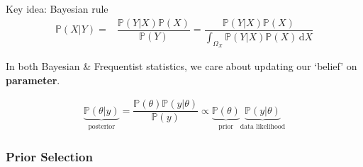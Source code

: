     



\subsection{}
Key idea: Bayesian rule
\begin{align*}
    \mathbb{P}\left( X|Y \right)=&\dfrac{\mathbb{P}\left( Y|X \right) \mathbb{P}\left( X  \right) }{\mathbb{P}\left( Y \right) }=\dfrac{\mathbb{P}\left( Y|X  \right) \mathbb{P}\left( X  \right) }{\int _{\Omega_X} \mathbb{P}\left( Y|X  \right) \mathbb{P}\left( X  \right)  \,\mathrm{d}X} 
\end{align*}

In both Bayesian \& Frequentist statistics, we care about updating our `belief' on \textbf{parameter}. 

\begin{align*}
    \underbrace{\mathbb{P}\left( \theta |y  \right)}_{\text{posterior}} =\dfrac{\mathbb{P}\left( \theta  \right) \mathbb{P}\left( y|\theta  \right) }{\mathbb{P}\left( y  \right) }\propto \underbrace{\mathbb{P}\left( \theta  \right) }_{\text{prior}}\underbrace{\mathbb{P}\left( y|\theta  \right)  }_{\text{data likelihood}}
\end{align*}


\subsubsection{Prior Selection}


